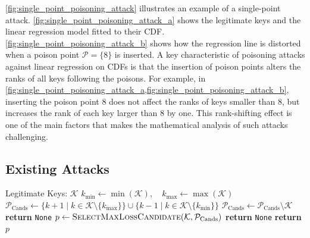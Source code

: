 \documentclass[acmsmall]{acmart}
\begin{document}
\cref{fig:single_point_poisoning_attack} illustrates an example of a single-point attack.
\cref{fig:single_point_poisoning_attack_a} shows the legitimate keys and the linear regression model fitted to their CDF.
\cref{fig:single_point_poisoning_attack_b} shows how the regression line is distorted when a poison point $\mathcal{P} = \{8\}$ is inserted.
A key characteristic of poisoning attacks against linear regression on CDFs is that the insertion of poison points alters the ranks of all keys following the poisons.
For example, in \cref{fig:single_point_poisoning_attack_a,fig:single_point_poisoning_attack_b}, inserting the poison point 8 does not affect the ranks of keys smaller than 8, but increases the rank of each key larger than 8 by one. 
This rank-shifting effect is one of the main factors that makes the mathematical analysis of such attacks challenging.

\subsection{Existing Attacks}
\label{sec:existing_attacks}

\begin{algorithm}[t]
    \caption{Single-point Poisoning Attack~\cite{kornaropoulos2022price}}
    \label{algo:single-point poisoning attack}
    \begin{algorithmic}[1]
    \Require Legitimate Keys: $\mathcal{K}$
        \State $k_\mathrm{min} \gets \min(\mathcal{K}), \quad k_\mathrm{max} \gets \max(\mathcal{K})$
        \State $\mathcal{P}_\mathrm{Cands} \gets \{k + 1 \mid k \in \mathcal{K} \setminus \{k_\mathrm{max}\}\} \cup \{k - 1 \mid k \in \mathcal{K} \setminus \{k_\mathrm{min}\}\}$
        \State $\mathcal{P}_\mathrm{Cands} \gets \mathcal{P}_\mathrm{Cands} \setminus \mathcal{K}$
         \textbf{return} \texttt{None} \EndIf
        \State $p \gets \textsc{SelectMaxLossCandidate}(\mathcal{K}, \mathcal{P}_\mathrm{Cands})$
         \textbf{return} \texttt{None} \EndIf
        \State \textbf{return} $p$
    \EndFunction
    \end{algorithmic}
\end{algorithm}
\end{document}
